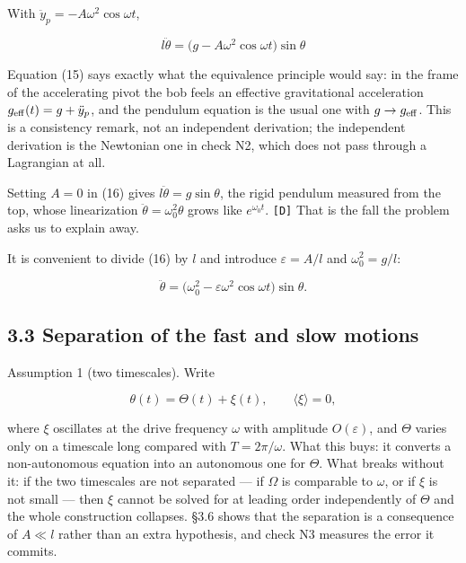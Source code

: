 \documentclass[11pt,a4paper]{article}
\newcommand{\tagmark}[1]{\marginnote{\scriptsize\ttfamily #1}}
\newcommand{\Dtag}{\tagmark{[D]}}   %
\newcommand{\Atag}{\tagmark{[A]}}   %
\providecommand{\passthrough}[1]{#1}
\begin{document}
With \(\ddot y_p = -A\omega^2\cos\omega t\),

\begin{equation}
\boxed{\;l\ddot\theta = \bigl(g - A\omega^2\cos\omega t\bigr)\sin\theta\;}
  \tag{16}
\end{equation}

\Dtag{} Equation (15) says exactly what the equivalence principle would say: in
the frame of the accelerating pivot the bob feels an effective gravitational
acceleration \(g_{\rm eff}(t)=g+\ddot y_p\), and the pendulum equation is the
usual one with \(g\to g_{\rm eff}\). This is a consistency remark, not an
independent derivation; the independent derivation is the Newtonian one in check
N2, which does not pass through a Lagrangian at all.

Setting \(A=0\) in (16) gives \(l\ddot\theta = g\sin\theta\), the rigid pendulum
measured from the top, whose linearization \(\ddot\theta=\omega_0^2\theta\) grows
like \(e^{\omega_0 t}\). \passthrough{\lstinline![D]!} That is the fall the problem asks us to explain
away.

It is convenient to divide (16) by \(l\) and introduce \(\varepsilon=A/l\) and
\(\omega_0^2=g/l\):

\begin{equation}
\ddot\theta = \bigl(\omega_0^2 - \varepsilon\omega^2\cos\omega t\bigr)
                \sin\theta. \tag{17}
\end{equation}

\hypertarget{separation-of-the-fast-and-slow-motions}{%
\subsection{3.3 Separation of the fast and slow motions}\label{separation-of-the-fast-and-slow-motions}}

\Atag{} Assumption 1 (two timescales). Write

\begin{equation}
\theta(t) = \Theta(t) + \xi(t),\qquad \langle\xi\rangle=0, \tag{18}
\end{equation}

where \(\xi\) oscillates at the drive frequency \(\omega\) with amplitude
\(O(\varepsilon)\), and \(\Theta\) varies only on a timescale long compared with
\(T=2\pi/\omega\). What this buys: it converts a non-autonomous equation into an
autonomous one for \(\Theta\). What breaks without it: if the two timescales are
not separated --- if \(\Omega\) is comparable to \(\omega\), or if \(\xi\) is not small
--- then \(\xi\) cannot be solved for at leading order independently of \(\Theta\) and
the whole construction collapses. §3.6 shows that the separation is a
consequence of \(A\ll l\) rather than an extra hypothesis, and check N3 measures
the error it commits.
\end{document}
